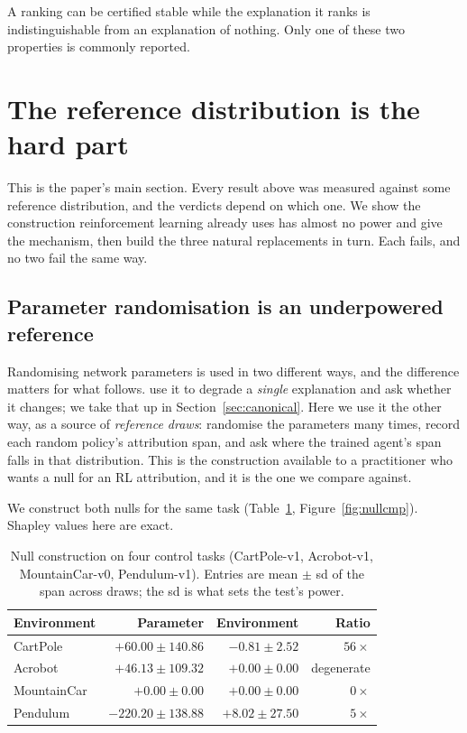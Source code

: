 \documentclass[10pt,twocolumn]{article}
\begin{document}
A ranking can be certified stable while the explanation it ranks is
indistinguishable from an explanation of nothing. Only one of these two
properties is commonly reported.

\section{The reference distribution is the hard part}
\label{sec:nullhard}

This is the paper's main section. Every result above was measured against some
reference distribution, and the verdicts depend on which one. We show the
construction reinforcement learning already uses has almost no power and give
the mechanism, then build the three natural replacements in turn. Each fails,
and no two fail the same way.

\subsection{Parameter randomisation is an underpowered reference}
\label{sec:nulls}

Randomising network parameters is used in two different ways, and the
difference matters for what follows. \citet{adebayo2018sanity} use it to
degrade a \emph{single} explanation and ask whether it changes; we take that up
in Section~\ref{sec:canonical}. Here we use it the other way, as a source of
\emph{reference draws}: randomise the parameters many times, record each random
policy's attribution span, and ask where the trained agent's span falls in that
distribution. This is the construction available to a practitioner who wants a
null for an RL attribution, and it is the one we compare against.

We construct both nulls for the same task (Table~\ref{tab:nulls},
Figure~\ref{fig:nullcmp}). Shapley values here are exact.

\begin{table}[t]
\centering\footnotesize
\caption{Null construction on four control tasks (CartPole-v1, Acrobot-v1,
MountainCar-v0, Pendulum-v1). Entries are mean $\pm$ sd of
the span across draws; the sd is what sets the test's power.}
\label{tab:nulls}
\begin{tabular}{lrrr}
\toprule
Environment & Parameter & Environment & Ratio \\
\midrule
CartPole    & $+60.00 \pm \mathbf{140.86}$ & $-0.81 \pm \mathbf{2.52}$ & $56\times$ \\
Acrobot     & $+46.13 \pm \mathbf{109.32}$ & $+0.00 \pm \mathbf{0.00}$ & degenerate \\
MountainCar & $+0.00 \pm \mathbf{0.00}$ & $+0.00 \pm \mathbf{0.00}$ & $0\times$ \\
Pendulum    & $-220.20 \pm \mathbf{138.88}$ & $+8.02 \pm \mathbf{27.50}$ & $5\times$ \\
\bottomrule
\end{tabular}
\end{table}
\end{document}
